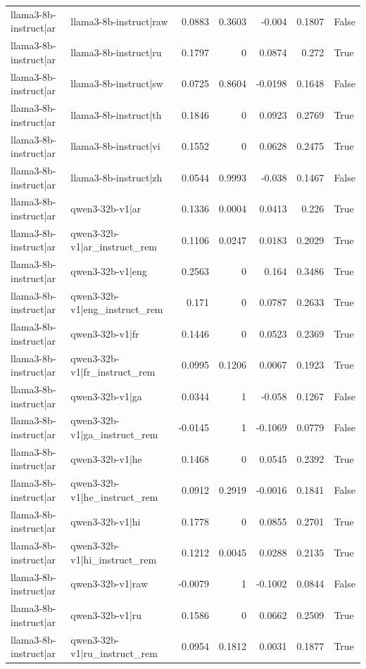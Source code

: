 \begin{table}
\begin{tabular}{l l r r r r l}
llama3-8b-instruct|ar & llama3-8b-instruct|raw & 0.0883 & 0.3603 & -0.004 & 0.1807 & False \\
llama3-8b-instruct|ar & llama3-8b-instruct|ru & 0.1797 & 0 & 0.0874 & 0.272 & True \\
llama3-8b-instruct|ar & llama3-8b-instruct|sw & 0.0725 & 0.8604 & -0.0198 & 0.1648 & False \\
llama3-8b-instruct|ar & llama3-8b-instruct|th & 0.1846 & 0 & 0.0923 & 0.2769 & True \\
llama3-8b-instruct|ar & llama3-8b-instruct|vi & 0.1552 & 0 & 0.0628 & 0.2475 & True \\
llama3-8b-instruct|ar & llama3-8b-instruct|zh & 0.0544 & 0.9993 & -0.038 & 0.1467 & False \\
llama3-8b-instruct|ar & qwen3-32b-v1|ar & 0.1336 & 0.0004 & 0.0413 & 0.226 & True \\
llama3-8b-instruct|ar & qwen3-32b-v1|ar_instruct_rem & 0.1106 & 0.0247 & 0.0183 & 0.2029 & True \\
llama3-8b-instruct|ar & qwen3-32b-v1|eng & 0.2563 & 0 & 0.164 & 0.3486 & True \\
llama3-8b-instruct|ar & qwen3-32b-v1|eng_instruct_rem & 0.171 & 0 & 0.0787 & 0.2633 & True \\
llama3-8b-instruct|ar & qwen3-32b-v1|fr & 0.1446 & 0 & 0.0523 & 0.2369 & True \\
llama3-8b-instruct|ar & qwen3-32b-v1|fr_instruct_rem & 0.0995 & 0.1206 & 0.0067 & 0.1923 & True \\
llama3-8b-instruct|ar & qwen3-32b-v1|ga & 0.0344 & 1 & -0.058 & 0.1267 & False \\
llama3-8b-instruct|ar & qwen3-32b-v1|ga_instruct_rem & -0.0145 & 1 & -0.1069 & 0.0779 & False \\
llama3-8b-instruct|ar & qwen3-32b-v1|he & 0.1468 & 0 & 0.0545 & 0.2392 & True \\
llama3-8b-instruct|ar & qwen3-32b-v1|he_instruct_rem & 0.0912 & 0.2919 & -0.0016 & 0.1841 & False \\
llama3-8b-instruct|ar & qwen3-32b-v1|hi & 0.1778 & 0 & 0.0855 & 0.2701 & True \\
llama3-8b-instruct|ar & qwen3-32b-v1|hi_instruct_rem & 0.1212 & 0.0045 & 0.0288 & 0.2135 & True \\
llama3-8b-instruct|ar & qwen3-32b-v1|raw & -0.0079 & 1 & -0.1002 & 0.0844 & False \\
llama3-8b-instruct|ar & qwen3-32b-v1|ru & 0.1586 & 0 & 0.0662 & 0.2509 & True \\
llama3-8b-instruct|ar & qwen3-32b-v1|ru_instruct_rem & 0.0954 & 0.1812 & 0.0031 & 0.1877 & True \\

\end{tabular}
\end{table}

